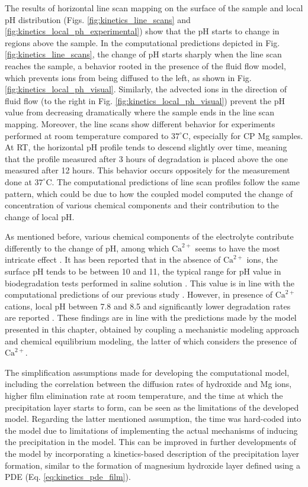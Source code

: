 The results of horizontal line scan mapping on the surface of the sample and local pH distribution (Figs. \ref{fig:kinetics_line_scans} and \ref{fig:kinetics_local_ph_experimental}) show that the pH starts to change in regions above the sample. In the computational predictions depicted in Fig. \ref{fig:kinetics_line_scans}, the change of pH starts sharply when the line scan reaches the sample, a behavior rooted in the presence of the fluid flow model, which prevents ions from being diffused to the left, as shown in Fig. \ref{fig:kinetics_local_ph_visual}. Similarly, the advected ions in the direction of fluid flow (to the right in Fig. \ref{fig:kinetics_local_ph_visual}) prevent the pH value from decreasing dramatically where the sample ends in the line scan mapping. Moreover, the line scans show different behavior for experiments performed at room temperature compared to $37^{\circ}\text{C}$, especially for \gls{CP} Mg samples. At \gls{RT}, the horizontal pH profile tends to descend slightly over time, meaning that the profile measured after 3 hours of degradation is placed above the one measured after 12 hours. This behavior occurs oppositely for the measurement done at $37^{\circ}\text{C}$. The computational predictions of line scan profiles follow the same pattern, which could be due to how the coupled model computed the change of concentration of various chemical components and their contribution to the change of local pH.

As mentioned before, various chemical components of the electrolyte contribute differently to the change of pH, among which $\mathrm{Ca}^{2+}$ seems to have the most intricate effect \cite{Willumeit-Roemer2019}. It has been reported that in the absence of $\mathrm{Ca}^{2+}$ ions, the surface pH tends to be between 10 and 11, the typical range for pH value in biodegradation tests performed in saline solution \cite{Gonzalez2021}. This value is in line with the computational predictions of our previous study \cite{Barzegari2021}. However, in presence of $\mathrm{Ca}^{2+}$ cations, local pH between 7.8 and 8.5 and significantly lower degradation rates are reported \cite{Mei2019,Gnedenkov2019,Tefashe2015,Lamaka2009}. These findings are in line with the predictions made by the model presented in this chapter, obtained by coupling a mechanistic modeling approach and chemical equilibrium modeling, the latter of which considers the presence of $\mathrm{Ca}^{2+}$.

The simplification assumptions made for developing the computational model, including the correlation between the diffusion rates of hydroxide and Mg ions, higher film elimination rate at room temperature, and the time at which the precipitation layer starts to form,  can be seen as the limitations of the developed model. Regarding the latter mentioned assumption, the time was hard-coded into the model due to limitations of implementing the actual mechanisms of inducing the precipitation in the model. This can be improved in further developments of the model by incorporating a kinetics-based description of the precipitation layer formation, similar to the formation of magnesium hydroxide layer defined using a PDE (Eq. \ref{eq:kinetics_pde_film}).

